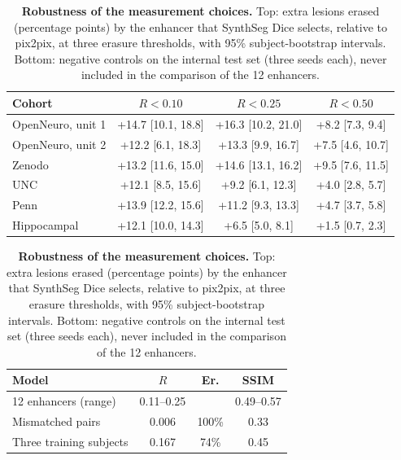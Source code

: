 \begin{table}[!htbp]
{\caption{\textbf{Robustness of the measurement choices.} Top: extra lesions erased (percentage points) by the enhancer that SynthSeg Dice selects, relative to pix2pix, at three erasure thresholds, with 95\% subject-bootstrap intervals. Bottom: negative controls on the internal test set (three seeds each), never included in the comparison of the 12 enhancers.}}
{\scriptsize\setlength{\tabcolsep}{3pt}\begin{tabular*}{\linewidth}{@{\extracolsep{\fill}}lccc@{}}
\toprule
Cohort & $R<0.10$ & $R<0.25$ & $R<0.50$ \\
\midrule
OpenNeuro, unit 1 & +14.7 [10.1, 18.8] & +16.3 [10.2, 21.0] & +8.2 [7.3, 9.4] \\
OpenNeuro, unit 2 & +12.2 [6.1, 18.3] & +13.3 [9.9, 16.7] & +7.5 [4.6, 10.7] \\
Zenodo & +13.2 [11.6, 15.0] & +14.6 [13.1, 16.2] & +9.5 [7.6, 11.5] \\
UNC & +12.1 [8.5, 15.6] & +9.2 [6.1, 12.3] & +4.0 [2.8, 5.7] \\
Penn & +13.9 [12.2, 15.6] & +11.2 [9.3, 13.3] & +4.7 [3.7, 5.8] \\
Hippocampal & +12.1 [10.0, 14.3] & +6.5 [5.0, 8.1] & +1.5 [0.7, 2.3] \\
\bottomrule
\end{tabular*}
\par\vspace{2ex}
\begin{tabular*}{\linewidth}{@{\extracolsep{\fill}}lccc@{}}
\toprule
Model & $R$ & Er. & SSIM \\
\midrule
12 enhancers (range) & 0.11--0.25 & & 0.49--0.57 \\
Mismatched pairs & 0.006 & 100\% & 0.33 \\
Three training subjects & 0.167 & 74\% & 0.45 \\
\bottomrule
\end{tabular*}}
\end{table}

